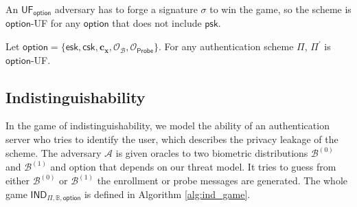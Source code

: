 An $\textsf{UF}_\textsf{option}$ adversary has to forge a signature $\sigma$ to win the game, so the scheme is $\textsf{option}$-UF for any $\textsf{option}$ that does not include $\textsf{psk}$. 

\begin{theorem}
\label{thm:sEUF-CMA-esk-csk}
	Let $\textsf{option} = \{ \textsf{esk}, \textsf{csk}, \mathbf{c_x}, \mathcal{O}_\mathcal{B}, \mathcal{O}_{\textsf{Probe}} \}$. For any authentication scheme $\Pi$, $\Pi^\prime$ is $\textsf{option}$-UF. 
\end{theorem}



\subsection{Indistinguishability}
\label{sec:ind_game}

In the game of indistinguishability, we model the ability of an authentication server who tries to identify the user, which describes the privacy leakage of the scheme. The adversary $\mathcal{A}$ is given oracles to two biometric distributions $\mathcal{B}^{(0)}$ and $ \mathcal{B}^{(1)}$ and \textsf{option} that depends on our threat model. It tries to guess from either $\mathcal{B}^{(0)}$ or $ \mathcal{B}^{(1)}$ the enrollment or probe messages are generated. The whole game $\textsf{IND}_{\Pi, \mathbb{B}, \textsf{option}}$ is defined in Algorithm \ref{alg:ind_game}.

